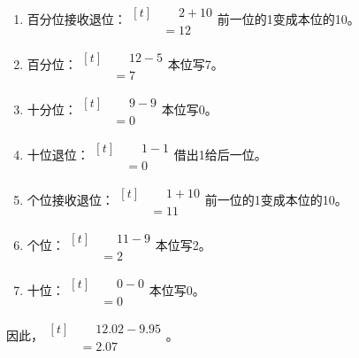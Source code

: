 {\begin{enumerate}[leftmargin=1.7em,itemsep=5pt,topsep=0pt]
\item 百分位接收退位：\(\begin{aligned}[t]&\phantom{={}}2+10\\&=12\end{aligned}\)\quad 前一位的1变成本位的10。
\item 百分位：\(\begin{aligned}[t]&\phantom{={}}12-5\\&=7\end{aligned}\)\quad 本位写7。
\item 十分位：\(\begin{aligned}[t]&\phantom{={}}9-9\\&=0\end{aligned}\)\quad 本位写0。
\item 十位退位：\(\begin{aligned}[t]&\phantom{={}}1-1\\&=0\end{aligned}\)\quad 借出1给后一位。
\item 个位接收退位：\(\begin{aligned}[t]&\phantom{={}}1+10\\&=11\end{aligned}\)\quad 前一位的1变成本位的10。
\item 个位：\(\begin{aligned}[t]&\phantom{={}}11-9\\&=2\end{aligned}\)\quad 本位写2。
\item 十位：\(\begin{aligned}[t]&\phantom{={}}0-0\\&=0\end{aligned}\)\quad 本位写0。
\end{enumerate}
\par\smallskip
因此，\(\begin{aligned}[t]&\phantom{={}}12.02-9.95\\&=2.07\end{aligned}\)。
\par\medskip

}
